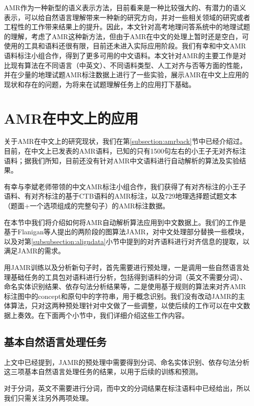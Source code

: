 \documentclass[master, winfont]{njuthesis}
\begin{document}
AMR作为一种新型的语义表示方法，目前看来是一种比较强大的、有潜力的语义表示，可以给自然语言理解带来一种新的研究方向，并对一些相关领域的研究或者工程性的工作带来结果上的提升\cite{kai2015improving}\cite{Pan2015}。因此，本文针对高考地理问答系统中的地理试题的理解，考虑了AMR这种新方法，但由于AMR在中文的处理上暂时还是空白，可使用的工具和语料还很有限，目前还未进入实际应用阶段。我们有幸和中文AMR语料标注小组合作，得到了更多可用的中文语料。本文针对AMR的主要工作是对比现有算法在不同语言（中英文）、不同语料类型、人工对齐与否等方面的性能，并在少量的地理试题AMR标注数据上进行了一些实验，展示AMR在中文上应用的现状和存在的问题，为将来在试题理解任务上的应用打下基础。

\section{AMR在中文上的应用}
关于AMR在中文上的研究现状，我们在第\ref{subsection:amrback}节中已经介绍过。目前，在中文上已发表的AMR语料，已知的只有1500句左右的小王子无对齐标注语料\cite{Li2016Annotating}；据我们所知，目前还没有针对AMR中文语料进行自动解析的算法及实验结果。

有幸与李斌老师带领的中文AMR标注小组合作，我们获得了有对齐标注的小王子语料、有对齐标注的基于CTB语料的AMR标注，以及729地理选择题试题文本（题面+一个选项组成的完整句子）的AMR标注数据。

在本节中我们将介绍如何将AMR自动解析算法应用到中文数据上。我们的工作是基于Flanigan等人\cite{Flanigan2014}提出的两阶段的图算法JAMR，对中文处理部分替换一些模块，以及对第\ref{subsubsection:aligndata}小节中提到的对齐语料进行对齐信息的提取，以满足JAMR的需求。

用JAMR训练以及分析新句子时，首先需要进行预处理，一是调用一些自然语言处理基础任务的工具包对语料进行分析，包括得到语料的分词（英文不需要分词）、命名实体识别结果、依存句法分析结果等，二是使用基于规则的算法来对齐AMR标注图中的concept和原句中的字符串，用于概念识别。我们没有改动JAMR的主体算法，只对这两种预处理针对中文做了一些调整，以使后续的工作可以在中文数据上奏效。在下面两个小节中，我们详细介绍这些工作内容。

\subsection{基本自然语言处理任务}
上文中已经提到，JAMR的预处理中需要得到分词、命名实体识别、依存句法分析这三项基本自然语言处理任务的结果，以用于后续的训练和预测。

对于分词，英文不需要进行分词，而中文的分词结果在标注语料中已经给出，所以我们只需关注另外两项处理。
\end{document}
